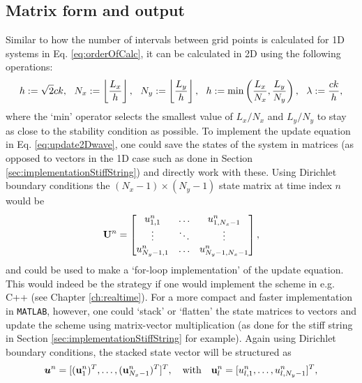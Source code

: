 \subsection{Matrix form and output}\label{sec:2DwaveImplementation}
Similar to how the number of intervals between grid points is calculated for 1D systems in Eq. \eqref{eq:orderOfCalc}, it can be calculated in 2D using the following operations:
\begin{equation}\label{eq:orderOfCalc2D}
    h := \sqrt{2} ck, \ \ N_x := \floor[\frac{L_x}{h}], \ \  N_y := \floor[\frac{L_y}{h}], \ \  h := \text{min}\left(\frac{L_x}{N_x}, \frac{L_y}{N_y}\right), \ \  \lambda := \frac{ck}{h},
\end{equation}
where the `$\text{min}$' operator selects the smallest value of $L_x/N_x$ and $L_y/N_y$ to stay as close to the stability condition as possible. 
To implement the update equation in Eq. \eqref{eq:update2Dwave}, one could save the states of the system in matrices (as opposed to vectors in the 1D case such as done in Section \ref{sec:implementationStiffString}) and directly work with these. Using Dirichlet boundary conditions the $(N_x-1) \times (N_y-1)$ state matrix at time index $n$ would be
\begin{equation}
    \mathbf{U}^n = \begin{bmatrix}
        u^n_{1, 1} & \hdots & u^n_{1, N_x-1}\\
        \vdots & \ddots & \vdots\\
        u^n_{N_y-1, 1} & \hdots & u^n_{N_y-1, N_x-1}
    \end{bmatrix},
\end{equation}
and could be used to make a `for-loop implementation' of the update equation. This would indeed be the strategy if one would implement the scheme in e.g. C++ (see Chapter \ref{ch:realtime}). For a more compact and faster implementation in \texttt{MATLAB}, however, one could `stack' or `flatten' the state matrices to vectors and update the scheme using matrix-vector multiplication (as done for the stiff string in Section \ref{sec:implementationStiffString} for example). Again using Dirichlet boundary conditions, the stacked state vector will be structured as
\begin{equation}\label{eq:stackedState}
    \boldsymbol{u}^n = [(\mathbf{u}_{1}^n)^T, \hdots, (\mathbf{u}_{N_x-1}^n)^T]^T, \quad \text{with} \quad \mathbf{u}^n_l = [u^n_{l, 1}, \hdots, u^n_{l, N_y-1}]^T,
\end{equation}
